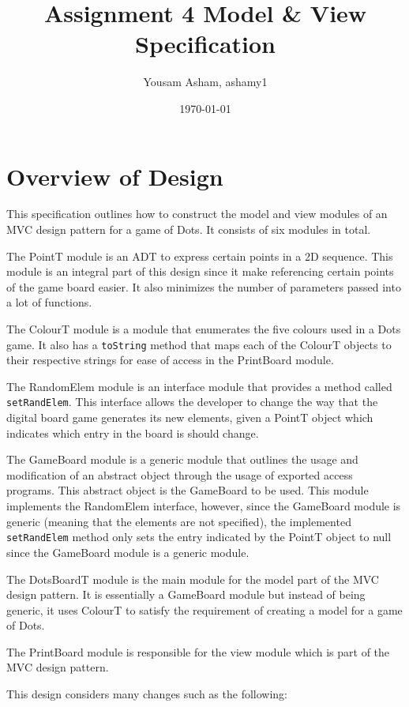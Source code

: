 \documentclass[12pt]{article}
\title{Assignment 4 Model \& View Specification}
\author{Yousam Asham, ashamy1}
\date{\today}
\begin{document}
\maketitle

\section*{Overview of Design}

This specification outlines how to construct the model and view modules of an MVC design pattern for a game of Dots. It consists of six modules in total.

The PointT module is an ADT to express certain points in a 2D sequence. This module is an integral part of this design since it make referencing certain points of the game board easier. It also minimizes the number of parameters passed into a lot of functions.

The ColourT module is a module that enumerates the five colours used in a Dots game. It also has a \verb|toString| method that maps each of the ColourT objects to their respective strings for ease of access in the PrintBoard module.

The RandomElem module is an interface module that provides a method called \verb|setRandElem|. This interface allows the developer to change the way that the digital board game generates its new elements, given a PointT object which indicates which entry in the board is should change.

The GameBoard module is a generic module that outlines the usage and modification of an abstract object through the usage of exported access programs. This abstract object is the GameBoard to be used. This module implements the RandomElem interface, however, since the GameBoard module is generic (meaning that the elements are not specified), the implemented \verb|setRandElem| method only sets the entry indicated by the PointT object to null since the GameBoard module is a generic module.

The DotsBoardT module is the main module for the model part of the MVC design pattern. It is essentially a GameBoard module but instead of being generic, it uses ColourT to satisfy the requirement of creating a model for a game of Dots.

The PrintBoard module is responsible for the view module which is part of the MVC design pattern.

This design considers many changes such as the following:
\end{document}
